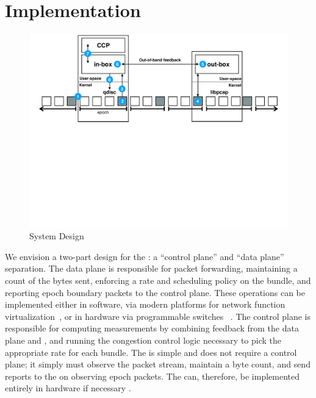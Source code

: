 \section{Implementation}\label{s:impl}
\begin{figure}
    \centering
    \includegraphics[width=2\columnwidth]{img/bundler-diagram}
    \caption{\name System Design
    }\label{fig:bundler}
\end{figure}

We envision a two-part design for the \inbox: a ``control plane'' and ``data plane'' separation.
The data plane is responsible for packet forwarding, maintaining a count of the  bytes sent, enforcing a rate and scheduling policy on the bundle, and reporting epoch boundary packets to the control plane.
These operations can be implemented either in software, via modern platforms for network function virtualization~\cite{bess, click, mos, netbricks}, or in hardware via programmable switches~\cite{p4} .
The control plane is responsible for computing measurements by combining feedback from the data plane and \outbox, and running the congestion control logic necessary to pick the appropriate rate for each bundle.
The \outbox is simple and does not require a control plane; it simply must observe the packet stream, maintain a byte count, and send reports to the \inbox on observing epoch packets.
The \outbox can, therefore, be implemented entirely in hardware if necessary .

